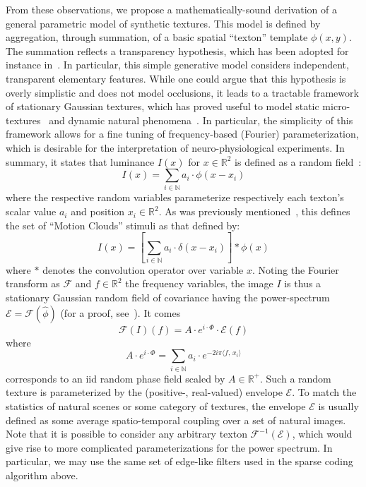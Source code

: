 \documentclass{article}
\newcommand{\dotp}[2]{\langle #1,\,#2\rangle}
\newcommand{\eql}[1]{\begin{equation}#1\end{equation}}
\newcommand{\RR}{\ensuremath{\mathbb{R}}}
\newcommand{\NN}{\ensuremath{\mathbb{N}}}
\begin{document}
From these observations, we propose a mathematically-sound derivation of a general parametric model of synthetic textures. This model is defined by aggregation, through summation, of a basic spatial ``texton'' template $\phi(x, y)$. The summation reflects a transparency hypothesis, which has been adopted for instance in~\citep{Galerne11}. In particular, this simple generative model considers independent, transparent elementary features. While one could argue that this hypothesis is overly simplistic and does not model occlusions, it leads to a tractable framework of stationary Gaussian textures, which has proved useful to model static micro-textures~\citep{Galerne11} and dynamic natural phenomena~\citep{2014-xia-siims}. In particular, the simplicity of this framework allows for a fine tuning of frequency-based (Fourier) parameterization, which is desirable for the interpretation of neuro-physiological experiments. In summary, it states that luminance $I(x)$ for $x \in \RR^2$ is defined as a random field~\citep{Vacher15}: \eql{\label{eq-deadleaves}
I (x) = \sum_{i \in \NN} a_i \cdot \phi(x-x_i)} where the respective random variables parameterize respectively each texton's scalar value $a_i$ and position $x_i \in \RR^2$. As was previously mentioned~\citep{Leon12,Vacher15}, this defines the set of ``Motion Clouds'' stimuli as that defined by: \eql{\label{eq-MC} I (x) = [\sum_{i \in \NN} a_i \cdot\delta(x-x_i)] \ast \phi(x) } where $\ast$ denotes the convolution operator over variable $x$. Noting the Fourier transform as $\mathcal{F}$ and $f \in \RR^2$ the frequency variables, the image $I$ is thus a stationary Gaussian random field of covariance having the power-spectrum $\mathcal{E}=\mathcal{F}(\hat{\phi})$ (for a proof, see~\citep{Vacher15}). It comes
\begin{equation*}
  \mathcal{F}(I) (f) = A \cdot e^{i \cdot \Phi} \cdot \mathcal{E} (f)
\end{equation*}
where
\begin{equation*}
A \cdot e^{i \cdot \Phi} = \sum_{i\in\NN} a_i \cdot e^{-2i\pi \dotp{f}{x_i}}
\end{equation*}
corresponds to an iid random phase field scaled by $A \in \RR^+$. Such a random texture is parameterized by the (positive-, real-valued) envelope $\mathcal{E}$. To match the statistics of natural scenes or some category of textures, the envelope $\mathcal{E}$ is usually defined as some average spatio-temporal coupling over a set of natural images. Note that it is possible to consider any arbitrary texton $\mathcal{F}^{-1}(\mathcal{E})$, which would give rise to more complicated parameterizations for the power spectrum. In particular, we may use the same set of edge-like filters used in the sparse coding algorithm above.
\end{document}
